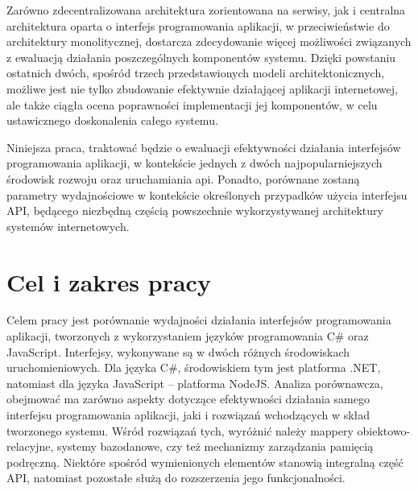 Zarówno zdecentralizowana architektura zorientowana na serwisy, jak i centralna architektura oparta o interfejs programowania aplikacji, w przeciwieństwie do architektury monolitycznej, dostarcza zdecydowanie więcej możliwości związanych z ewaluacją działania poszczególnych komponentów systemu. Dzięki powstaniu ostatnich dwóch, spośród trzech przedstawionych modeli architektonicznych, możliwe jest nie tylko zbudowanie efektywnie działającej aplikacji internetowej, ale także ciągła ocena poprawności implementacji jej komponentów, w celu ustawicznego doskonalenia całego systemu.

Niniejsza praca, traktować będzie o ewaluacji efektywności działania interfejsów programowania aplikacji, w kontekście jednych z dwóch najpopularniejszych środowisk rozwoju oraz uruchamiania api. Ponadto, porównane zostaną parametry wydajnościowe w kontekście określonych przypadków użycia interfejsu API, będącego niezbędną częścią powszechnie wykorzystywanej architektury systemów internetowych.

\section{Cel i zakres pracy}
Celem pracy jest porównanie wydajności działania interfejsów programowania aplikacji, tworzonych z wykorzystaniem języków programowania C\# oraz JavaScript. Interfejsy, wykonywane są w dwóch różnych środowiskach uruchomieniowych. Dla języka C\#, środowiskiem tym jest platforma .NET, natomiast dla języka JavaScript – platforma NodeJS. Analiza porównawcza, obejmować ma zarówno aspekty dotyczące efektywności działania samego interfejsu programowania aplikacji, jaki i rozwiązań wchodzących w skład tworzonego systemu. Wśród rozwiązań tych, wyróżnić należy mappery obiektowo-relacyjne, systemy bazodanowe, czy też mechanizmy zarządzania pamięcią podręczną. Niektóre spośród wymienionych elementów stanowią integralną część API, natomiast pozostałe służą do rozszerzenia jego funkcjonalności.

